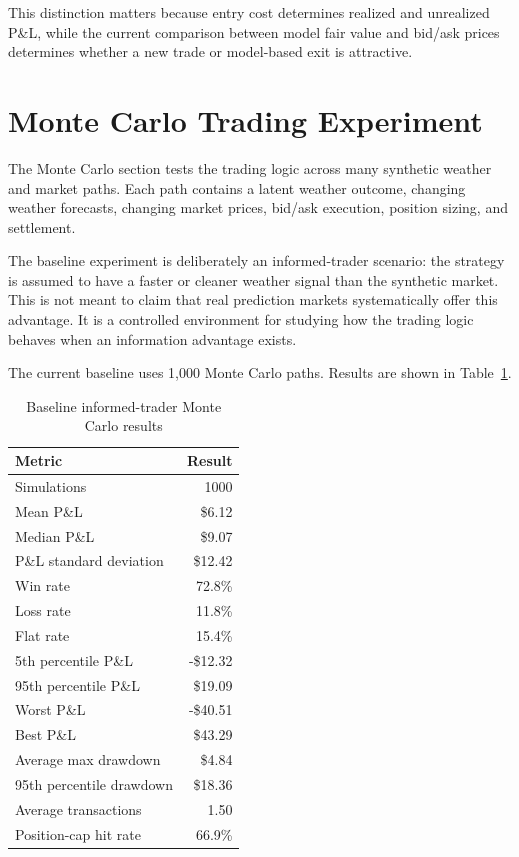 \documentclass[11pt]{article}
\begin{document}
This distinction matters because entry cost determines realized and unrealized P\&L, while the current comparison between model fair value and bid/ask prices determines whether a new trade or model-based exit is attractive.

\section{Monte Carlo Trading Experiment}

The Monte Carlo section tests the trading logic across many synthetic weather and market paths. Each path contains a latent weather outcome, changing weather forecasts, changing market prices, bid/ask execution, position sizing, and settlement.

The baseline experiment is deliberately an informed-trader scenario: the strategy is assumed to have a faster or cleaner weather signal than the synthetic market. This is not meant to claim that real prediction markets systematically offer this advantage. It is a controlled environment for studying how the trading logic behaves when an information advantage exists.

The current baseline uses 1,000 Monte Carlo paths. Results are shown in Table~\ref{tab:mc}.

\begin{table}[H]
\centering
\caption{Baseline informed-trader Monte Carlo results}
\label{tab:mc}
\begin{tabular}{lr}
\toprule
Metric & Result \\
\midrule
Simulations & 1000 \\
Mean P\&L & \$6.12 \\
Median P\&L & \$9.07 \\
P\&L standard deviation & \$12.42 \\
Win rate & 72.8\% \\
Loss rate & 11.8\% \\
Flat rate & 15.4\% \\
5th percentile P\&L & -\$12.32 \\
95th percentile P\&L & \$19.09 \\
Worst P\&L & -\$40.51 \\
Best P\&L & \$43.29 \\
Average max drawdown & \$4.84 \\
95th percentile drawdown & \$18.36 \\
Average transactions & 1.50 \\
Position-cap hit rate & 66.9\% \\
\bottomrule
\end{tabular}
\end{table}
\end{document}
